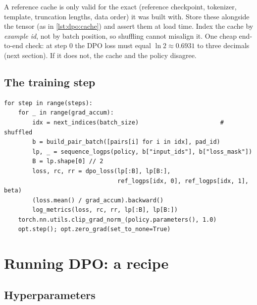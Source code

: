 \begin{pitfall}
A reference cache is only valid for the exact (reference checkpoint, tokenizer, template,
truncation lengths, data order) it was built with. Store these alongside the tensor (as in
\cref{lst:dpo:cache}) and assert them at load time. Index the cache by \emph{example id}, not
by batch position, so shuffling cannot misalign it. One cheap end-to-end check: at step 0 the DPO
loss must equal $\ln 2\approx 0.6931$ to three decimals (next section). If it does not, the cache
and the policy disagree.
\end{pitfall}

\subsection{The training step}

\begin{lstlisting}[caption={One optimizer step of DPO with gradient accumulation (the lab's \ident{dpo_train_loop}, abridged).},label={lst:dpo:step}]
for step in range(steps):
    for _ in range(grad_accum):
        idx = next_indices(batch_size)                       # shuffled
        b = build_pair_batch([pairs[i] for i in idx], pad_id)
        lp, _ = sequence_logps(policy, b["input_ids"], b["loss_mask"])
        B = lp.shape[0] // 2
        loss, rc, rr = dpo_loss(lp[:B], lp[B:],
                                ref_logps[idx, 0], ref_logps[idx, 1], beta)
        (loss.mean() / grad_accum).backward()
        log_metrics(loss, rc, rr, lp[:B], lp[B:])
    torch.nn.utils.clip_grad_norm_(policy.parameters(), 1.0)
    opt.step(); opt.zero_grad(set_to_none=True)
\end{lstlisting}

\section{Running DPO: a recipe}\label{sec:dpo:recipe}

\subsection{Hyperparameters}

